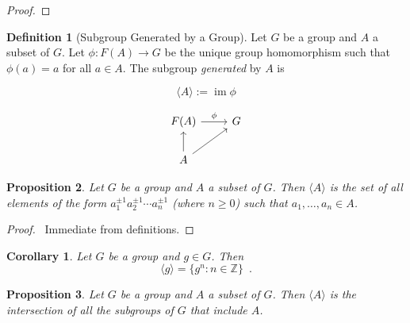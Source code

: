 \documentclass{book}
\let\qed\relax
\newtheorem{prop}{Proposition}[chapter]
\newtheorem{cor}{Corollary}[prop]
\theoremstyle{definition}
\newtheorem{df}[prop]{Definition}
\newcommand{\im}{\ensuremath{\operatorname{im}}}
\begin{document}
\begin{proof}
    \pf
    \qed
\end{proof}

\begin{df}[Subgroup Generated by a Group]
Let $G$ be a group and $A$ a subset of $G$. Let $\phi : F(A) \rightarrow G$ be the unique group homomorphism such that $\phi(a) = a$ for all $a \in A$. The subgroup \emph{generated} by $A$ is

\[ \langle A \rangle := \im \phi \]

\[ \begin{tikzcd}
F(A) \arrow[r,"\phi"] & G \\
A \arrow[u] \arrow[ur]
\end{tikzcd} \]
\end{df}

\begin{prop}
Let $G$ be a group and $A$ a subset of $G$. Then $\langle A \rangle$ is the set of all elements of the form $a_1^{\pm 1} a_2^{\pm 1} \cdots a_n^{\pm 1}$ (where $n \geq 0$) such that $a_1, \ldots, a_n \in A$.
\end{prop}

\begin{proof}
\pf\ Immediate from definitions. \qed
\end{proof}

\begin{cor}
Let $G$ be a group and $g \in G$. Then
\[ \langle g \rangle = \{ g^n : n \in \mathbb{Z} \} \enspace . \]
\end{cor}

\begin{prop}
Let $G$ be a group and $A$ a subset of $G$. Then $\langle A \rangle$ is the intersection of all the subgroups of $G$ that include $A$.
\end{prop}
\end{document}
